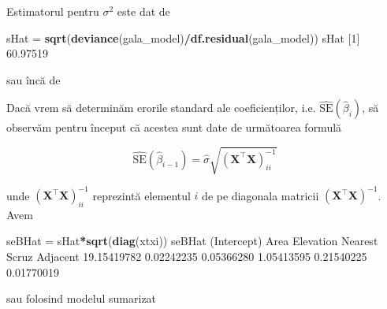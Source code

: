 \documentclass[]{article}
\newenvironment{Shaded}{\begin{snugshade}}{\end{snugshade}}
\newcommand{\KeywordTok}[1]{\textcolor[rgb]{0.13,0.29,0.53}{\textbf{#1}}}
\newcommand{\DecValTok}[1]{\textcolor[rgb]{0.00,0.00,0.81}{#1}}
\newcommand{\FloatTok}[1]{\textcolor[rgb]{0.00,0.00,0.81}{#1}}
\newcommand{\StringTok}[1]{\textcolor[rgb]{0.31,0.60,0.02}{#1}}
\newcommand{\OperatorTok}[1]{\textcolor[rgb]{0.81,0.36,0.00}{\textbf{#1}}}
\newcommand{\NormalTok}[1]{#1}
\begin{document}
Estimatorul pentru \(\sigma^2\) este dat de

\begin{Shaded}
\begin{Highlighting}[]
\NormalTok{sHat =}\StringTok{ }\KeywordTok{sqrt}\NormalTok{(}\KeywordTok{deviance}\NormalTok{(gala_model)}\OperatorTok{/}\KeywordTok{df.residual}\NormalTok{(gala_model))}
\NormalTok{sHat}
\NormalTok{[}\DecValTok{1}\NormalTok{] }\FloatTok{60.97519}
\end{Highlighting}
\end{Shaded}

sau încă de

\begin{Shaded}
\end{Shaded}

Dacă vrem să determinăm erorile standard ale coeficienților, i.e.
\(\hat{\mathrm{SE}}(\hat\beta_i)\), să observăm pentru început că
acestea sunt date de următoarea formulă

\[
\hat{\mathrm{SE}}(\hat\beta_{i-1}) = \hat{\sigma}\sqrt{(\mathbf{X}^\intercal\mathbf{X})^{-1}_{ii}}
\]

unde \((\mathbf{X}^\intercal\mathbf{X})^{-1}_{ii}\) reprezintă elementul
\(i\) de pe diagonala matricii
\((\mathbf{X}^\intercal\mathbf{X})^{-1}\). Avem

\begin{Shaded}
\begin{Highlighting}[]
\NormalTok{seBHat =}\StringTok{ }\NormalTok{sHat}\OperatorTok{*}\KeywordTok{sqrt}\NormalTok{(}\KeywordTok{diag}\NormalTok{(xtxi))}
\NormalTok{seBHat}
\NormalTok{(Intercept)        Area   Elevation     Nearest       Scruz    Adjacent }
\FloatTok{19.15419782}  \FloatTok{0.02242235}  \FloatTok{0.05366280}  \FloatTok{1.05413595}  \FloatTok{0.21540225}  \FloatTok{0.01770019} 
\end{Highlighting}
\end{Shaded}

sau folosind modelul sumarizat

\begin{Shaded}
\end{Shaded}
\end{document}
